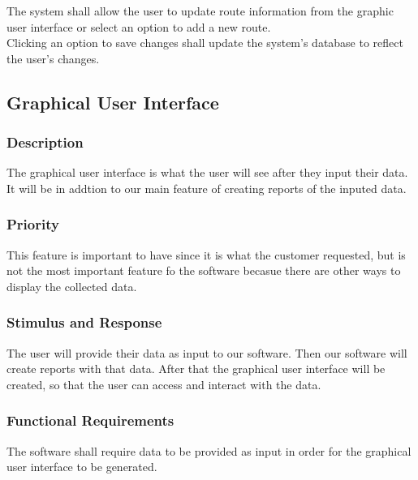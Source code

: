 The system shall allow the user to update route information from the graphic user interface or select an option to add a new route. \\

Clicking an option to save changes shall update the system's database to reflect the user's changes.

\subsection{Graphical User Interface}

\subsubsection{Description}

The graphical user interface is what the user will see after they input their data. It will be in addtion to our main feature of creating reports of the inputed data.

\subsubsection{Priority}

This feature is important to have since it is what the customer requested, but is not the most important feature fo the software becasue there are other ways to display the collected data.

\subsubsection{Stimulus and Response}

The user will provide their data as input to our software. Then our software will create reports with that data. After that the graphical user interface will be created, so that the user can access and interact with the data. 

\subsubsection{Functional Requirements}

The software shall require data to be provided as input in order for the graphical user interface to be generated.

